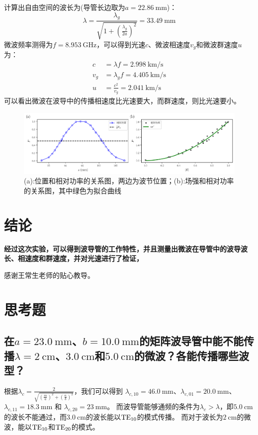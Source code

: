 \documentclass[font=fandol]{mpltx}
\begin{document}
计算出自由空间的波长为(导管长边取为$a=\qty{22.86}{\mm}$)：
$$\lambda=\frac{\lambda_g}{\sqrt{1+(\frac{\lambda_g}{2a})^2}}=\qty{33.49}{\mm}$$
微波频率测得为$f=\qty{8.953}\GHz{}$，可以得到光速$c$、微波相速度$v_g$和微波群速度$u$为：
$$
\begin{aligned}
	c &=\lambda f = \qty{2.998}{\km\per\s}\\
	v_g &= \lambda_g f=\qty{4.405}{\km\per\s}\\
	u &= \frac{c^2}{v_g}=\qty{2.041}{\km\per\s}
\end{aligned}
$$
可以看出微波在波导中的传播相速度比光速要大，而群速度，则比光速要小。

\begin{figure}
	\centering
	\includegraphics[width=0.85\linewidth]{fig/3.png}
	\caption{(a):位置和相对功率的关系图，两边为波节位置；(b):场强和相对功率的关系图，其中绿色为拟合曲线}
	\label{fig:3}
\end{figure}

\section{结论}
\textbf{经过这次实验，可以得到波导管的工作特性，并且测量出微波在导管中的波导波长、相速度和群速度，并对光速进行了检证，}

\begin{acknowledgments}
	感谢王常生老师的贴心教导。
\end{acknowledgments}



\clearpage %
\appendix %
\section{思考题}\label{app:exercise}
\subsection{在$a=\qty{23.0}{\mm}$、$b=\qty{10.0}{\mm}$的矩阵波导管中能不能传播$\lambda=\qty{2}{\cm}$、$\qty{3.0}{\cm}$和$\qty{5.0}{\cm}$的微波？各能传播哪些波型？}

根据$\lambda_c=\frac{2}{\sqrt{(\frac{m}{a})^2+(\frac{n}{b})^2}}$，我们可以得到
$\lambda_{c,10}=\qty{46.0}{\mm}$、$\lambda_{c,01} = \qty{20.0}{\mm}$、$\lambda_{c,11} = \qty{18.3}{\mm}$ 和 $\lambda_{c,20} = \qty{23}{\mm}$。
而波导管能够通频的条件为$\lambda_c>\lambda$，即$\qty{5.0}{\cm}$的波长不能通过，而$\qty{3.0}{\cm}$的波长能以$\rm{TE_{10}}$的模式传播。
而对于波长为$\qty{2}{\cm}$的微波，能以$\rm{TE_{10}}$和$\rm{TE_{20}}$的模式。
\end{document}
